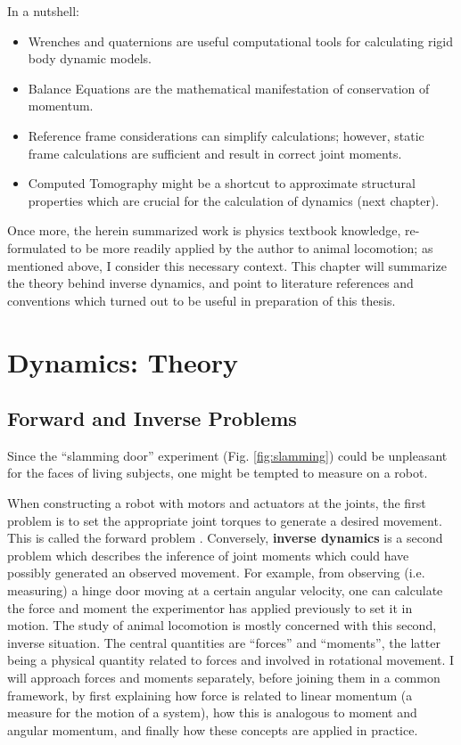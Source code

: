 In a nutshell:
\begin{itemize}
\item Wrenches and quaternions are useful computational tools for calculating rigid body dynamic models.
\item Balance Equations are the mathematical manifestation of conservation of momentum.
\item Reference frame considerations can simplify calculations; however, static frame calculations are sufficient and result in correct joint moments.
\end{itemize}

\begin{itemize}
\item Computed Tomography might be a shortcut to approximate structural properties which are crucial for the calculation of dynamics (next chapter).
\end{itemize}


Once more, the herein summarized work is physics textbook knowledge, re-formulated to be more readily applied by the author to animal locomotion; as mentioned above, I consider this necessary context.
This chapter will summarize the theory behind inverse dynamics, and point to literature references and conventions which turned out to be useful in preparation of this thesis.


\section{Dynamics: Theory}
\label{sec:orgb5f6de2}
\subsection{Forward and Inverse Problems}
\label{sec:orgb135384}
Since the ``slamming door'' experiment (Fig. \ref{fig:slamming}) could be unpleasant for the faces of living subjects, one might be tempted to measure on a robot.

When constructing a robot with motors and actuators at the joints, the first problem is to set the appropriate joint torques to generate a desired movement.
This is called the forward problem \citep{Lynch2017}.
Conversely, \textbf{inverse dynamics} is a second problem which describes the inference of joint moments which could have possibly generated an observed movement.
For example, from observing (i.e. measuring) a hinge door moving at a certain angular velocity, one can calculate the force and moment the experimentor has applied previously to set it in motion.
The study of animal locomotion is mostly concerned with this second, inverse situation.
The central quantities are ``forces'' and ``moments'', the latter being a physical quantity related to forces and involved in rotational movement.
I will approach forces and moments separately, before joining them in a common framework, by first explaining how force is related to linear momentum (a measure for the motion of a system), how this is analogous to moment and angular momentum, and finally how these concepts are applied in practice.



